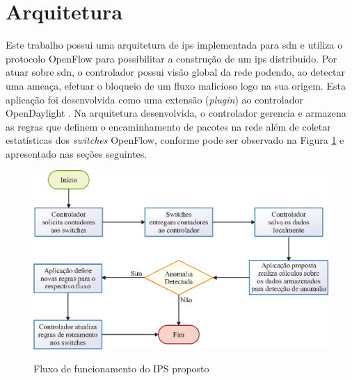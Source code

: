 \FloatBarrier
\section{Arquitetura}
\label{sec:arq-prop}

Este trabalho  possui uma arquitetura de \gls{ips} implementada para \gls{sdn} e utiliza o protocolo OpenFlow para possibilitar a construção de um \gls{ips} distribuído. Por atuar sobre \gls{sdn}, o controlador possui visão global da rede podendo, ao detectar uma ameaça, efetuar o bloqueio de um fluxo malicioso logo na sua origem. Esta aplicação foi desenvolvida como uma extensão (\textit{plugin}) ao controlador OpenDaylight \cite{website:odl}. 
Na arquitetura desenvolvida, o controlador gerencia e armazena as regras que definem o encaminhamento de pacotes na rede além de coletar estatísticas dos \textit{switches} OpenFlow, conforme pode ser observado na Figura \ref{fig:arch-proposta} e apresentado nas seções seguintes.

\begin{figure}
  \centering
  \caption{Fluxo de funcionamento do IPS proposto}
  \includegraphics[width=.90\textwidth]{images/fluxo-arq.eps}
  \label{fig:arch-proposta}
\end{figure}

\FloatBarrier




